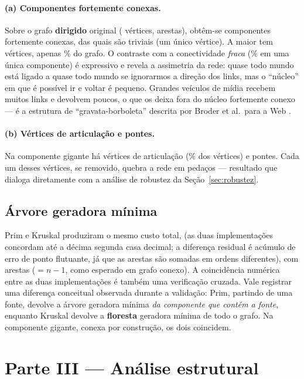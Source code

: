 \documentclass[sigconf]{webmedia}
\begin{document}
\paragraph{(a) Componentes fortemente conexas.} Sobre o grafo
\textbf{dirigido} original (\nDirigido{} vértices, \mDirigido{} arestas),
obtêm-se \numSCC{} componentes fortemente conexas, das quais \sccTriviais{}
são triviais (um único vértice). A maior tem \maiorSCC{} vértices, apenas
\fracSCC{}\% do grafo. O contraste com a conectividade \emph{fraca}
(\fracCG{}\% em uma única componente) é expressivo e revela a assimetria
da rede: quase todo mundo está ligado a quase todo mundo se ignorarmos a
direção dos links, mas o ``núcleo'' em que é possível ir e voltar é
pequeno. Grandes veículos de mídia recebem muitos links e devolvem poucos,
o que os deixa fora do núcleo fortemente conexo --- é a estrutura de
``gravata-borboleta'' descrita por Broder et al.\ para a Web
\cite{broder2000}.

\paragraph{(b) Vértices de articulação e pontes.} Na componente gigante há
\numArticulacoes{} vértices de articulação (\fracArticulacoes{}\% dos
vértices) e \numPontes{} pontes. Cada um desses vértices, se removido,
quebra a rede em pedaços --- resultado que dialoga diretamente com a
análise de robustez da Seção~\ref{sec:robustez}.

\subsection{Árvore geradora mínima}

Prim e Kruskal produziram o mesmo custo total, \custoMST{} (as duas
implementações concordam até a décima segunda casa decimal; a diferença
residual é acúmulo de erro de ponto flutuante, já que as arestas são
somadas em ordens diferentes), com \arestasMST{} arestas ($=n-1$, como esperado em grafo conexo). A
coincidência numérica entre as duas implementações é também uma verificação
cruzada. Vale registrar uma diferença conceitual observada durante a
validação: Prim, partindo de uma fonte, devolve a árvore geradora mínima
\emph{da componente que contém a fonte}, enquanto Kruskal devolve a
\textbf{floresta} geradora mínima de todo o grafo. Na componente gigante,
conexa por construção, os dois coincidem.

\section{Parte III --- Análise estrutural}
\label{sec:parte3}
\end{document}
